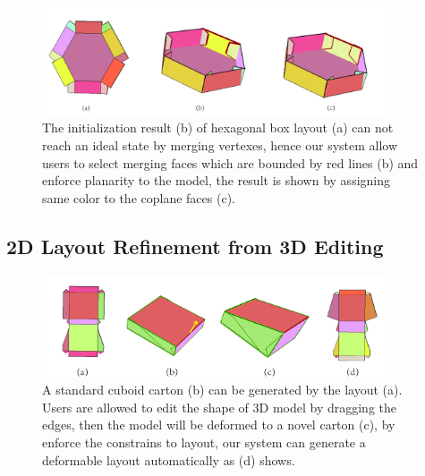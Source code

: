 \begin{figure}
	\centering
	\includegraphics[width=0.9\textwidth]{images/facepaste.jpg}
	\caption{The initialization result (b) of hexagonal box layout (a) can not reach an ideal state by merging vertexes, hence our system allow users to select merging faces which are bounded by red lines (b) and enforce planarity to the model, the result is shown by assigning same color to the coplane faces (c). }
	\label{fig:facepaste}
\end{figure}



\subsection{2D Layout Refinement from 3D Editing}


{}

\begin{figure}
	\centering
	\includegraphics[width=0.9\textwidth]{images/editing.jpg}
	\caption{A standard cuboid carton (b) can be generated by the layout (a). Users are allowed to edit the shape of 3D model by dragging the edges, then the model will be deformed to a novel carton (c), by enforce the constrains to layout, our system can generate a deformable layout automatically as (d) shows.}
	\label{fig:editing}
\end{figure}